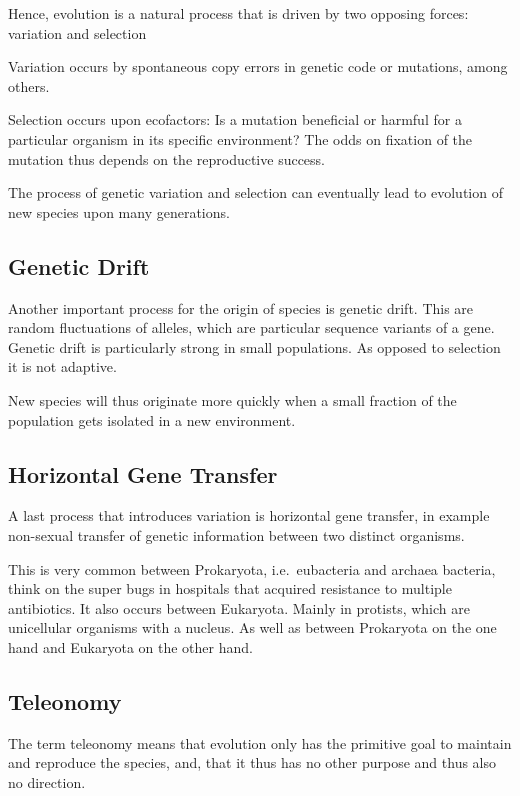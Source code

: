 \documentclass[
  11pt,
]{book}
\begin{document}
Hence, evolution is a natural process that is driven by two opposing forces: variation and selection

Variation occurs by spontaneous copy errors in genetic code or mutations, among others.

Selection occurs upon ecofactors: Is a mutation beneficial or harmful for a particular organism in its specific environment?
The odds on fixation of the mutation thus depends on the reproductive success.

The process of genetic variation and selection can eventually lead to evolution of new species upon many generations.

\hypertarget{genetic-drift}{%
\subsection{Genetic Drift}\label{genetic-drift}}

Another important process for the origin of species is genetic drift. This are random fluctuations of alleles, which are particular sequence variants of a gene. Genetic drift is particularly strong in small populations. As opposed to selection it is not adaptive.

New species will thus originate more quickly when a small fraction of the population gets isolated in a new environment.

\hypertarget{horizontal-gene-transfer}{%
\subsection{Horizontal Gene Transfer}\label{horizontal-gene-transfer}}

A last process that introduces variation is horizontal gene transfer, in example non-sexual transfer of genetic information between two distinct organisms.

This is very common between Prokaryota, i.e.~eubacteria and archaea bacteria, think on the super bugs in hospitals that acquired resistance to multiple antibiotics. It also occurs between Eukaryota. Mainly in protists, which are unicellular organisms with a nucleus. As well as between Prokaryota on the one hand and Eukaryota on the other hand.

\hypertarget{teleonomy}{%
\subsection{Teleonomy}\label{teleonomy}}

The term teleonomy means that evolution only has the primitive goal to maintain and reproduce the species, and, that it thus has no other purpose and thus also no direction.
\end{document}
